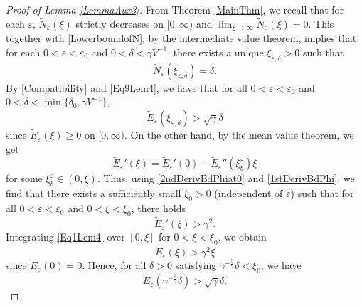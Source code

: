 \documentclass{amsart}
\newcommand{\veps}{\varepsilon}
\numberwithin{equation}{section}
\theoremstyle{plain}%
\theoremstyle{definition}
\theoremstyle{remark}
\theoremstyle{remark}
\begin{document}
\begin{proof}[Proof of Lemma \ref{LemmaAux3}]
From Theorem \ref{MainThm}, we recall that for each $\veps$, $\widetilde{N}_\veps(\xi)$ strictly decreases on $[0,\infty)$ and $\lim_{\xi \to \infty}\widetilde{N}_\veps(\xi)=0$.  This together with \eqref{LowerboundofN}, by the intermediate value theorem, implies that   for each $0<\veps<\veps_0$ and $0<\delta <  \gamma V^{-1}$,  there exists a unique $\xi_{\veps,\delta}>0$ such that 
\begin{equation}\label{Eq9Lem4}
\widetilde{N}_\veps(\xi_{\veps,\delta})=\delta.
\end{equation}
By \eqref{Compatibility} and \eqref{Eq9Lem4}, we have that for all $0<\veps<\veps_0$ and $0 < \delta < \min\{\delta_0,\gamma V^{-1}\}$, 
\begin{equation}\label{Eq4Lem4}
\widetilde{E}_\veps (\xi_{\veps,\delta})>\sqrt{\gamma}\delta
\end{equation}
since $\widetilde{E}_\veps(\xi)\geq 0$ on $[0,\infty)$. On the other hand, by the mean value theorem, we get
\[
\widetilde{E}_\veps'(\xi) = \widetilde{E}_\veps'(0) - \widetilde{E}_\veps''(\xi^\veps_b) \xi
\]
for some $\xi^\veps_b\in (0,\xi)$. Thus, using \eqref{2ndDerivBdPhiat0} and \eqref{1stDerivBdPhi}, we find that there exists a sufficiently small $\xi_0>0$ (independent of $\veps$) such that for all $0<\veps<\veps_0$ and $0 < \xi <  \xi_0$, there holds
\begin{equation}\label{Eq1Lem4}
\widetilde{E}_\veps'(\xi) > \gamma^2.
\end{equation}
  Integrating \eqref{Eq1Lem4} over $[0,\xi]$ for $0<\xi < \xi_0$, we obtain 
\begin{equation}\label{Eq11Lem4}
\widetilde{E}_\veps(\xi) > \gamma^2\xi
\end{equation}
since $\widetilde{E}_\veps(0)=0$. Hence, for all $\delta>0$ satisfying $\gamma^{-\frac{3}{2}}\delta < \xi_0$, we have 
\begin{equation}\label{Eq3Lem4}
\widetilde{E}_\veps(\gamma^{-\frac{3}{2}}\delta) > \sqrt{\gamma}\delta.
\end{equation}


\end{proof}
\end{document}
